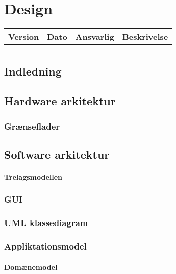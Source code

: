 \chapter{Design}

\begin{longtabu} to 
    Version &    Dato &    Ansvarlig &    Beskrivelse\\[-1ex]
    \midrule
    
\label{version_Systemark}
\end{longtabu}

\section{Indledning}

  
\section{Hardware arkitektur}


\subsection{Grænseflader}

\section{Software arkitektur}


\subsubsection{Trelagsmodellen}

\subsection{GUI}

\subsection{UML klassediagram}


\subsection{Appliktationsmodel}
 

\subsubsection{Domænemodel}

